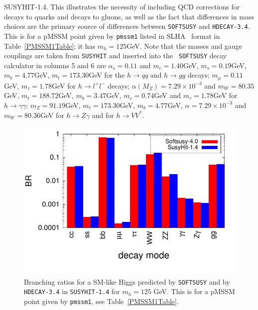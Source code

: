 \documentclass[final,3p,times,pdflatex]{elsarticle}
\begin{document}
\begin{center}
\begin{table}
{{    SUSYHIT-1.4}. This illustrates the necessity of including QCD corrections
  for decays to quarks and decays to gluons, as well as the fact that
  differences in mass choices are the primary source of differences between
  {\tt SOFTSUSY} and {\tt HDECAY-3.4}. This is for a pMSSM point given by {\tt pmssm1}
  listed in SLHA~\cite{Skands:2003cj} format in Table~\ref{PMSSM1Table}; it
  has $m_h = 125$GeV. Note that the masses
  and gauge couplings are taken from {\tt SUSYHIT} and inserted into the {\tt
    SOFTSUSY}\/ decay calculator in columns 5 and 6 are $\alpha_s = 0.11$ and
  $m_c = 
  1.40$GeV,   $m_s = 0.19$GeV, $m_b = 4.77$GeV, $m_t = 173.30$GeV for
  the $h \rightarrow qq$ 
  and $h \rightarrow gg$ decays; $m_{\mu} = 0.11$GeV, $m_{\tau} = 1.78$GeV for
  $h \rightarrow l^+ l^-$ decays; $\alpha(M_Z) = 7.29\times10^{-3}$ and $m_W =
  80.35$GeV, $m_t = 188.72$GeV, $m_b = 3.47$GeV, $m_c = 0.74$GeV and $m_{\tau}
  = 1.78$GeV for $h \rightarrow \gamma \gamma$; $m_Z = 91.19$GeV, $m_t =
  173.30$GeV, $m_b = 4.77$GeV, $\alpha = 7.29\times10^{-3}$ and $m_W =
  80.36$GeV for $h \rightarrow Z \gamma$ and %
 for $h  \rightarrow VV^*$.}  
\label{h0SMliketable}
\end{table}
\end{center}


\begin{figure}%
\centerline{\includegraphics[scale=1]{figure1option2.pdf}} 
\caption{Branching ratios for a SM-like Higgs predicted by {\tt SOFTSUSY} and
  by {\tt HDECAY-3.4} in {\tt SUSYHIT-1.4} for $m_h=125$
  GeV. This is for a pMSSM point given by {\tt pmssm1}, see Table~\ref{PMSSM1Table}.} \label{h0SMBRsbarplot} 
\end{figure}
\end{document}
